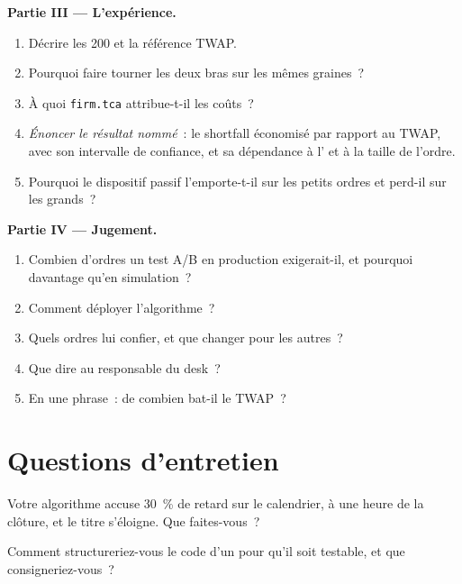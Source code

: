 \begin{problem}
\medskip\noindent\textbf{Partie III --- L'expérience.}
\begin{enumerate}[resume]
\item Décrire les 200  et la référence TWAP.
\item Pourquoi faire tourner les deux bras sur les mêmes graines~?
\item À quoi \texttt{firm.tca} attribue-t-il les coûts~?
\item \emph{Énoncer le résultat nommé}~: le shortfall économisé par rapport au TWAP, avec son intervalle de confiance, et sa dépendance à l' et à la taille de l'ordre.
\item Pourquoi le dispositif passif l'emporte-t-il sur les petits ordres et perd-il sur les grands~?
\end{enumerate}

\medskip\noindent\textbf{Partie IV --- Jugement.}
\begin{enumerate}[resume]
\item Combien d'ordres un test A/B en production exigerait-il, et pourquoi davantage qu'en simulation~?
\item Comment déployer l'algorithme~?
\item Quels ordres lui confier, et que changer pour les autres~?
\item Que dire au responsable du desk~?
\item En une phrase~: de combien bat-il le TWAP~?
\end{enumerate}
\end{problem}

\section{Questions d'entretien}

\begin{interviewq}\label{iq:mx:build-an-execution-algorithm:1}
Votre algorithme accuse 30~\% de retard sur le calendrier, à une heure de la clôture, et le titre s'éloigne. Que faites-vous~?
\end{interviewq}

\begin{interviewq}\label{iq:mx:build-an-execution-algorithm:2}
Comment structureriez-vous le code d'un  pour qu'il soit testable, et que consigneriez-vous~?
\end{interviewq}

